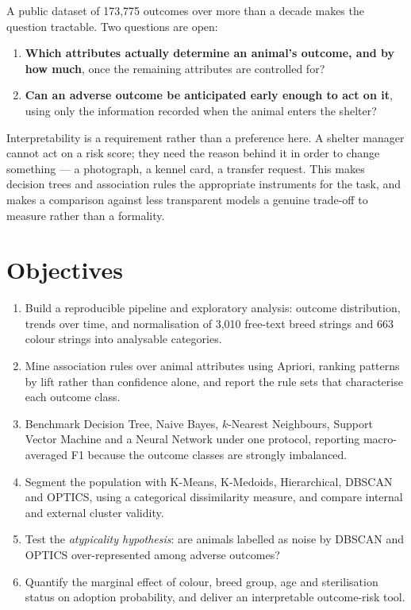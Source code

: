 \documentclass[11pt,a4paper]{article}
\begin{document}
A public dataset of 173{,}775 outcomes over more than a decade makes the question
tractable. Two questions are open:

\begin{enumerate}[label=\textbf{\arabic*.}]
  \item \textbf{Which attributes actually determine an animal's outcome, and by how
        much}, once the remaining attributes are controlled for?
  \item \textbf{Can an adverse outcome be anticipated early enough to act on it}, using
        only the information recorded when the animal enters the shelter?
\end{enumerate}

Interpretability is a requirement rather than a preference here. A shelter manager
cannot act on a risk score; they need the reason behind it in order to change
something --- a photograph, a kennel card, a transfer request. This makes decision
trees and association rules the appropriate instruments for the task, and makes a
comparison against less transparent models a genuine trade-off to measure rather than
a formality.

\section*{Objectives}

\begin{enumerate}[label=\arabic*.]
  \item Build a reproducible pipeline and exploratory analysis: outcome distribution,
        trends over time, and normalisation of 3{,}010 free-text breed strings and
        663 colour strings into analysable categories.
  \item Mine association rules over animal attributes using Apriori, ranking patterns
        by lift rather than confidence alone, and report the rule sets that
        characterise each outcome class.
  \item Benchmark Decision Tree, Naive Bayes, $k$-Nearest Neighbours, Support Vector
        Machine and a Neural Network under one protocol, reporting macro-averaged F1
        because the outcome classes are strongly imbalanced.
  \item Segment the population with K-Means, K-Medoids, Hierarchical, DBSCAN and
        OPTICS, using a categorical dissimilarity measure, and compare internal and
        external cluster validity.
  \item Test the \emph{atypicality hypothesis}: are animals labelled as noise by
        DBSCAN and OPTICS over-represented among adverse outcomes?
  \item Quantify the marginal effect of colour, breed group, age and sterilisation
        status on adoption probability, and deliver an interpretable outcome-risk tool.
\end{enumerate}
\end{document}
